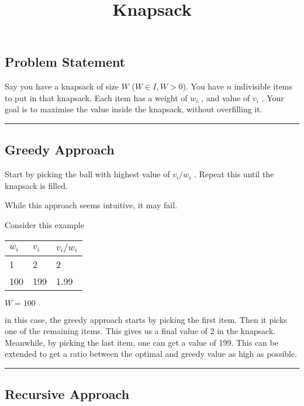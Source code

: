 \documentclass[
]{article}
\title{Knapsack}
\author{}
\date{}
\begin{document}
\maketitle

\hypertarget{problem-statement}{%
\subsection{Problem Statement}\label{problem-statement}}

Say you have a knapsack of size {\(W\)} ({\(W \in I,W > 0\)}). You have
{\(n\)} indivisible items to put in that knapsack. Each item has a
weight of {\(w_{i}\)} , and value of {\(v_{i}\)} . Your goal is to
maximise the value inside the knapsack, without overfilling it.

\begin{center}\rule{0.5\linewidth}{0.5pt}\end{center}

\hypertarget{greedy-approach}{%
\subsection{Greedy Approach}\label{greedy-approach}}

Start by picking the ball with highest value of {\(v_{i}/w_{i}\)} .
Repeat this until the knapsack is filled.

While this approach seems intuitive, it may fail.

Consider this example

\begin{longtable}[]{@{}lll@{}}
\toprule
{\(w_{i}\)} & {\(v_{i}\)} & {\(v_{i}/w_{i}\)} \\
\midrule
\endhead
1 & 2 & 2 \\
100 & 199 & 1.99 \\
\bottomrule
\end{longtable}

{\(W = 100\)}

in this case, the greedy approach starts by picking the first item. Then
it picks one of the remaining items. This gives us a final value of 2 in
the knapsack. Meanwhile, by picking the last item, one can get a value
of 199. This can be extended to get a ratio between the optimal and
greedy value as high as possible.

\begin{center}\rule{0.5\linewidth}{0.5pt}\end{center}

\hypertarget{recursive-approach}{%
\subsection{Recursive Approach}\label{recursive-approach}}
\end{document}
